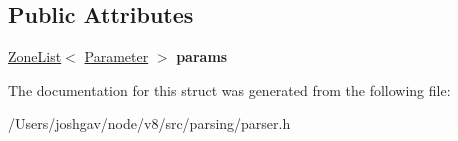 \subsection*{Public Attributes}
\begin{DoxyCompactItemize}
\item 
\hyperlink{classv8_1_1internal_1_1_zone_list}{Zone\+List}$<$ \hyperlink{structv8_1_1internal_1_1_parser_formal_parameters_1_1_parameter}{Parameter} $>$ {\bfseries params}\hypertarget{structv8_1_1internal_1_1_parser_formal_parameters_a5068033c6e2428f3ee8f53113b1293af}{}\label{structv8_1_1internal_1_1_parser_formal_parameters_a5068033c6e2428f3ee8f53113b1293af}

\end{DoxyCompactItemize}


The documentation for this struct was generated from the following file\+:\begin{DoxyCompactItemize}
\item 
/\+Users/joshgav/node/v8/src/parsing/parser.\+h\end{DoxyCompactItemize}
